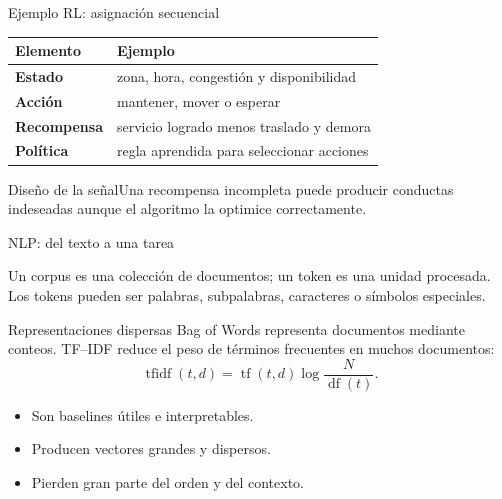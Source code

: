 \documentclass[aspectratio=169,10pt]{beamer}
\begin{document}
\begin{frame}{Ejemplo RL: asignación secuencial}
  \small
  \begin{tabularx}{\textwidth}{>{\bfseries}p{}X}\toprule
  Elemento & Ejemplo\\\midrule
  Estado & zona, hora, congestión y disponibilidad\\
  Acción & mantener, mover o esperar\\
  Recompensa & servicio logrado menos traslado y demora\\
  Política & regla aprendida para seleccionar acciones\\\bottomrule
  \end{tabularx}
  \begin{alertblock}{Diseño de la señal}Una recompensa incompleta puede producir conductas indeseadas aunque el algoritmo la optimice correctamente.\end{alertblock}
\end{frame}

\begin{frame}{NLP: del texto a una tarea}
  \begin{center}
  \end{center}
  \small Un corpus es una colección de documentos; un token es una unidad procesada. Los tokens pueden ser palabras, subpalabras, caracteres o símbolos especiales.
\end{frame}

\begin{frame}{Representaciones dispersas}
  Bag of Words representa documentos mediante conteos. TF--IDF reduce el peso de términos frecuentes en muchos documentos:
  \[
    \operatorname{tfidf}(t,d)=\operatorname{tf}(t,d)\log\frac{N}{\operatorname{df}(t)}.
  \]
  \begin{itemize}
    \item Son baselines útiles e interpretables.
    \item Producen vectores grandes y dispersos.
    \item Pierden gran parte del orden y del contexto.
  \end{itemize}
\end{frame}
\end{document}
